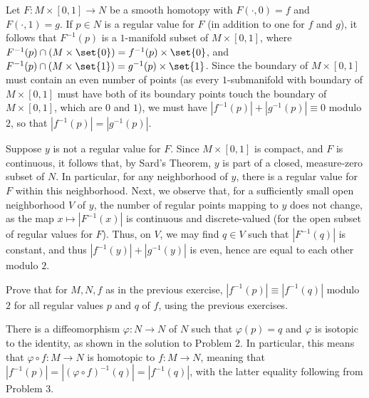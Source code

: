 \documentclass[10pt]{mypackage}
\begin{document}
\begin{solution}
  Let $F\colon M\times [0,1]\rightarrow N$ be a smooth homotopy with $F\left( \cdot,0 \right) = f$ and $F\left( \cdot,1 \right) = g$. If $p\in N$ is a regular value for $F$ (in addition to one for $f$ and $g$), it follows that $F^{-1}(p)$ is a $1$-manifold subset of $M\times [0,1]$, where $F^{-1}(p)\cap \left( M\times \set{0} \right) = f^{-1}(p)\times \set{0}$, and $F^{-1}(p)\cap \left( M\times \set{1} \right) = g^{-1}(p)\times \set{1}$. Since the boundary of $M\times \left[ 0,1 \right]$ must contain an even number of points (as every $1$-submanifold with boundary of $M\times [0,1]$ must have both of its boundary points touch the boundary of $M\times \left[ 0,1 \right]$, which are $0$ and $1$), we must have $\left\vert f^{-1}(p) \right\vert + \left\vert g^{-1}(p) \right\vert \equiv 0$ modulo $2$, so that $ \left\vert f^{-1}(p) \right\vert = \left\vert g^{-1}(p) \right\vert $.\newline

  Suppose $y$ is not a regular value for $F$. Since $M\times [0,1]$ is compact, and $F$ is continuous, it follows that, by Sard's Theorem, $y$ is part of a closed, measure-zero subset of $N$. In particular, for any neighborhood of $y$, there is a regular value for $F$ within this neighborhood. Next, we observe that, for a sufficiently small open neighborhood $V$ of $y$, the number of regular points mapping to $y$ does not change, as the map $x\mapsto \left\vert F^{-1}(x) \right\vert$ is continuous and discrete-valued (for the open subset of regular values for $F$). Thus, on $V$, we may find $q\in V$ such that $\left\vert F^{-1}(q) \right\vert$ is constant, and thus $\left\vert f^{-1}(y) \right\vert + \left\vert g^{-1}(y) \right\vert$ is even, hence are equal to each other modulo $2$.
\end{solution}
\begin{problem}[Problem 4]
  Prove that for $M,N,f$ as in the previous exercise, $\left\vert f^{-1}(p) \right\vert \equiv \left\vert f^{-1}(q) \right\vert$ modulo $2$ for all regular values $p$ and $q$ of $f$, using the previous exercises.
\end{problem}
\begin{solution}
  There is a diffeomorphism $\varphi\colon N\rightarrow N$ of $N$ such that $\varphi\left( p \right) = q$ and $\varphi$ is isotopic to the identity, as shown in the solution to Problem 2. In particular, this means that $\varphi\circ f\colon M\rightarrow N$ is homotopic to $f\colon M\rightarrow N$, meaning that $\left\vert f^{-1}(p) \right\vert = \left\vert \left( \varphi\circ f \right)^{-1}(q) \right\vert = \left\vert f^{-1}(q) \right\vert$, with the latter equality following from Problem 3.
\end{solution}
\end{document}
